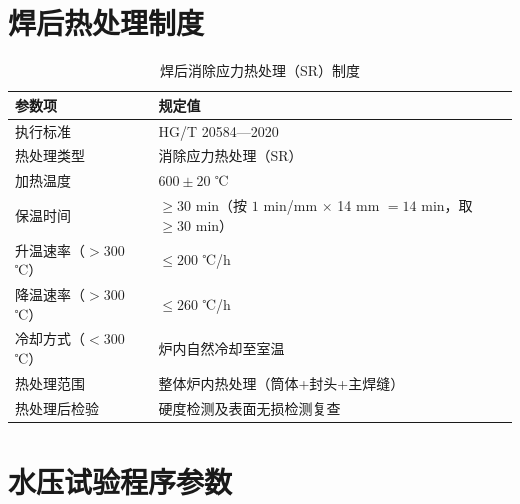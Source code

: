 \section{焊后热处理制度}
\label{sec:cad-pwht}

\begin{table}[htbp]
  \centering
  \caption{焊后消除应力热处理（SR）制度}
  \label{tab:cad-pwht-detail}
  \small\renewcommand{\arraystretch}{1.15}
  \setlength{\tabcolsep}{10pt}
  \begin{tabularx}{\textwidth}{@{}l l @{}}
    \toprule
    \textbf{参数项} & \textbf{规定值} \\
    \midrule
    执行标准                & HG/T 20584—2020 \\
    热处理类型              & 消除应力热处理（SR） \\
    加热温度                & $600\pm20$ ℃ \\
    保温时间                & $\ge 30$ min（按 $1$ min/mm $\times$ 14 mm $= 14$ min，取 $\ge 30$ min） \\
    升温速率（$>300$ ℃）   & $\le 200$ ℃/h \\
    降温速率（$>300$ ℃）   & $\le 260$ ℃/h \\
    冷却方式（$<300$ ℃）   & 炉内自然冷却至室温 \\
    热处理范围              & 整体炉内热处理（筒体+封头+主焊缝） \\
    热处理后检验            & 硬度检测及表面无损检测复查 \\
    \bottomrule
  \end{tabularx}
\end{table}

\section{水压试验程序参数}
\label{sec:cad-hydrotest}

